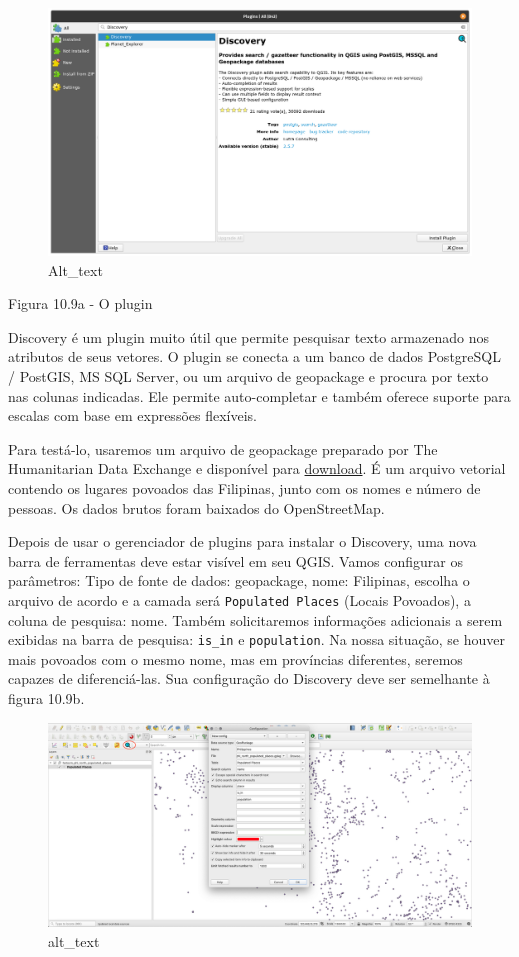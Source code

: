 \documentclass[
  portuguese,
]{krantz}
\begin{document}
\begin{figure}
\centering
\includegraphics{media/modulo10/fig109_a.png}
\caption{Alt\_text}
\end{figure}

Figura 10.9a - O plugin

Discovery é um plugin muito útil que permite pesquisar texto armazenado nos atributos de seus vetores. O plugin se conecta a um banco de dados PostgreSQL / PostGIS, MS SQL Server, ou um arquivo de geopackage e procura por texto nas colunas indicadas. Ele permite auto-completar e também oferece suporte para escalas com base em expressões flexíveis.

Para testá-lo, usaremos um arquivo de geopackage preparado por The Humanitarian Data Exchange e disponível para \href{https://data.humdata.org/dataset/hotosm_phl_north_populated_places}{download}. É um arquivo vetorial contendo os lugares povoados das Filipinas, junto com os nomes e número de pessoas. Os dados brutos foram baixados do OpenStreetMap.

Depois de usar o gerenciador de plugins para instalar o Discovery, uma nova barra de ferramentas deve estar visível em seu QGIS. Vamos configurar os parâmetros: Tipo de fonte de dados: geopackage, nome: Filipinas, escolha o arquivo de acordo e a camada será \texttt{Populated\ Places} (Locais Povoados), a coluna de pesquisa: nome. Também solicitaremos informações adicionais a serem exibidas na barra de pesquisa: \texttt{is\_in} e \texttt{population}. Na nossa situação, se houver mais povoados com o mesmo nome, mas em províncias diferentes, seremos capazes de diferenciá-las. Sua configuração do Discovery deve ser semelhante à figura 10.9b.

\begin{figure}
\centering
\includegraphics{media/modulo10/fig109_b.png}
\caption{alt\_text}
\end{figure}
\end{document}
